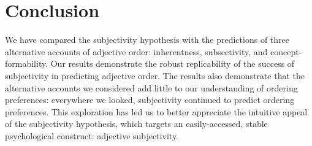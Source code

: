 \documentclass[12pt]{article}
\begin{document}
\section{Conclusion}

We have compared the subjectivity hypothesis with the predictions of three alternative accounts of adjective order: inherentness, subsectivity, and concept-formability. Our results demonstrate the robust replicability of the success of subjectivity in predicting adjective order. The results also demonstrate that the alternative accounts we considered add little to our understanding of ordering preferences: everywhere we looked, subjectivity continued to predict ordering preferences. This exploration has led us to better appreciate the intuitive appeal of the subjectivity hypothesis, which targets an easily-accessed, stable psychological construct: adjective subjectivity.





 

\end{document}
